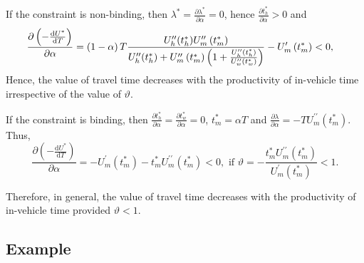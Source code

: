\documentclass[12pt,a4paper,british]{article}
\makeatletter
\newenvironment{proof}[1][\proofname]{\par
    \normalfont\topsep6\p@\@plus6\p@\relax
    \trivlist
    \itemindent\parindent
    \item[\hskip\labelsep
          \scshape
      #1]\ignorespaces
  }{%
    \endtrivlist\@endpefalse
  }
\providecommand{\proofname}{Proof}
\makeatother
\begin{document}
\begin{proof}
\begin{casenv}
\item If the constraint is non-binding, then $\lambda^{\ast} = \frac{\partial\lambda^{\ast}}{\partial\alpha} = 0$, hence $\frac{\partial t_{h}^{\ast}}{\partial\alpha}>0$ and 
\begin{align*}
\frac{\partial\left(-\frac{\mathrm{d}U^{\ast}}{\mathrm{d}T}\right)}{\partial\alpha} & =\left(1-\alpha\right)T\frac{U_{h}^{\prime\prime}\text{\ensuremath{\left(t_{h}^{\ast}\right)}}U_{m}^{\prime\prime}\left(t_{m}^{\ast}\right)}{U_{h}^{\prime\prime}\text{\ensuremath{\left(t_{h}^{\ast}\right)}}+U_{m}^{\prime\prime}\left(t_{m}^{\ast}\right)\left(1+\frac{U_{h}^{\prime\prime}\text{\ensuremath{\left(t_{h}^{\ast}\right)}}}{U_{w}^{\prime\prime}\left(t_{w}^{\ast}\right)}\right)}-U_{m}^{\prime}\left(t_{m}^{\ast}\right)<0,
\end{align*}
Hence, the value of travel time decreases with the productivity of in-vehicle time irrespective of the value of $\vartheta$.
\item If the constraint is binding, then $\frac{\partial t_{h}^{\ast}}{\partial\alpha}=\frac{\partial t_{w}^{\ast}}{\partial\alpha}=0$, $t_{m}^{\ast}=\alpha T$ and $\frac{\partial\lambda}{\partial\alpha}=-TU_{m}^{\prime\prime}\left(t_{m}^{\ast}\right)$. Thus,%
\begin{equation*}
\frac{\partial\left(-\frac{\mathrm{d}U^{\ast}}{\mathrm{d}T}\right)}{\partial\alpha}=-U_{m}^{\prime}\left(t_{m}^{\ast}\right)-t_{m}^{\ast}U_{m}^{\prime\prime}\left(t_{m}^{\ast}\right)<0,\mbox{ if }\vartheta=-\frac{t_{m}^{\ast}U_{m}^{\prime\prime}\left(t_{m}^{\ast}\right)}{U_{m}^{\prime}\left(t_{m}^{\ast}\right)}<1.
\end{equation*}
\end{casenv}
Therefore, in general, the value of travel time decreases with the productivity of in-vehicle time provided $\vartheta<1$.
\end{proof}

\subsection*{Example}
\end{document}
